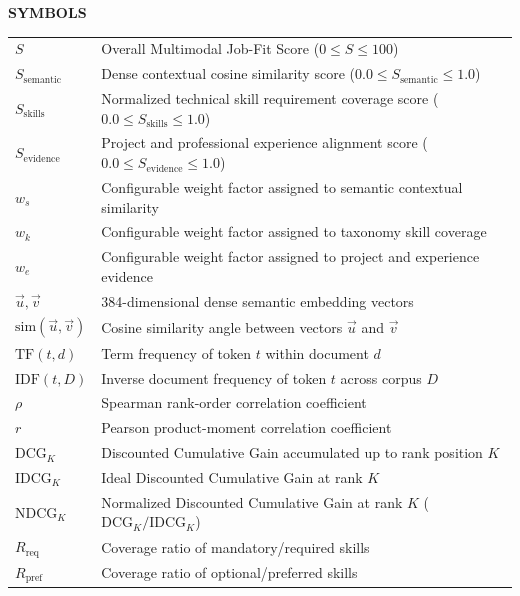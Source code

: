 \documentclass[12pt,a4paper]{report}
\begin{document}
\newpage
{}
\begin{center}
    {\Large \textbf{SYMBOLS}}
\end{center}
\vspace{0.8cm}

\begin{tabular}{p{2.5cm} p{11.5cm}}
$S$ & Overall Multimodal Job-Fit Score ($0 \le S \le 100$) \\
$S_{\text{semantic}}$ & Dense contextual cosine similarity score ($0.0 \le S_{\text{semantic}} \le 1.0$) \\
$S_{\text{skills}}$ & Normalized technical skill requirement coverage score ($0.0 \le S_{\text{skills}} \le 1.0$) \\
$S_{\text{evidence}}$ & Project and professional experience alignment score ($0.0 \le S_{\text{evidence}} \le 1.0$) \\
$w_s$ & Configurable weight factor assigned to semantic contextual similarity \\
$w_k$ & Configurable weight factor assigned to taxonomy skill coverage \\
$w_e$ & Configurable weight factor assigned to project and experience evidence \\
$\vec{u}, \vec{v}$ & 384-dimensional dense semantic embedding vectors \\
$\text{sim}(\vec{u}, \vec{v})$ & Cosine similarity angle between vectors $\vec{u}$ and $\vec{v}$ \\
$\text{TF}(t, d)$ & Term frequency of token $t$ within document $d$ \\
$\text{IDF}(t, D)$ & Inverse document frequency of token $t$ across corpus $D$ \\
$\rho$ & Spearman rank-order correlation coefficient \\
$r$ & Pearson product-moment correlation coefficient \\
$\text{DCG}_K$ & Discounted Cumulative Gain accumulated up to rank position $K$ \\
$\text{IDCG}_K$ & Ideal Discounted Cumulative Gain at rank $K$ \\
$\text{NDCG}_K$ & Normalized Discounted Cumulative Gain at rank $K$ ($\text{DCG}_K / \text{IDCG}_K$) \\
$R_{\text{req}}$ & Coverage ratio of mandatory/required skills \\
$R_{\text{pref}}$ & Coverage ratio of optional/preferred skills \\
\end{tabular}
\end{document}
